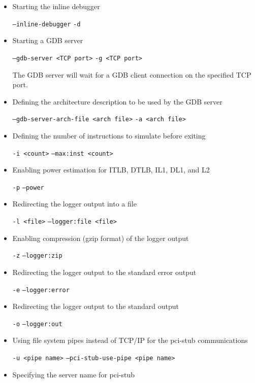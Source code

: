 \begin{itemize}

\item Starting the inline debugger

\texttt{--inline-debugger}
\texttt{-d}

\item Starting a GDB server

\texttt{--gdb-server <TCP port>}
\texttt{-g <TCP port>}

The GDB server will wait for a GDB client connection on the specified TCP port.

\item Defining the architecture description to be used by the GDB server

\texttt{--gdb-server-arch-file <arch file>}
\texttt{-a  <arch file>}

\item Defining the number of instructions to simulate before exiting

\texttt{-i <count>}
\texttt{--max:inst <count>}

\item Enabling power estimation for ITLB, DTLB, IL1, DL1, and L2

\texttt{-p}
\texttt{--power}

\item Redirecting the logger output into a file

\texttt{-l <file>}
\texttt{--logger:file <file>}

\item Enabling compression (gzip format) of the logger output

\texttt{-z}
\texttt{--logger:zip}

\item Redirecting the logger output to the standard error output

\texttt{-e}
\texttt{--logger:error}

\item Redirecting the logger output to the standard output

\texttt{-o}
\texttt{--logger:out}

\item Using file system pipes instead of TCP/IP for the pci-stub communications

\texttt{-u <pipe name>}
\texttt{--pci-stub-use-pipe <pipe name>}

\item Specifying the server name for pci-stub


\end{itemize}
